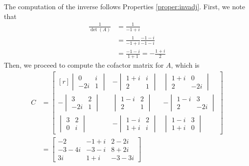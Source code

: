 \begin{solution}
The computation of the inverse follows Properties \ref{proper:invadj}. First, we note that
\begin{align*}
\frac{1}{\det(A)} &= \frac{1}{-1+i} \\
&= \frac{1}{-1+i} \frac{-1-i}{-1-i} \\
&= \frac{-1-i}{1+1} = -\frac{1+i}{2}
\end{align*}
Then, we proceed to compute the cofactor matrix for $A$, which is
\begin{align*}
C &=
\begin{bmatrix*}[r]
\begin{vmatrix}
0 & i \\
-2i & 1
\end{vmatrix} &
-\begin{vmatrix}
1+i & i \\
2 & 1
\end{vmatrix} &
\begin{vmatrix}
1+i & 0 \\
2 & -2i
\end{vmatrix} \\[10pt]
-\begin{vmatrix}
3 & 2 \\
-2i & 1
\end{vmatrix} &
\begin{vmatrix}
1-i & 2 \\
2 & 1
\end{vmatrix} &
-\begin{vmatrix}
1-i & 3 \\
2 & -2i
\end{vmatrix} \\[10pt]
\begin{vmatrix}
3 & 2 \\
0 & i
\end{vmatrix} &
-\begin{vmatrix}
1-i & 2 \\
1+i & i
\end{vmatrix} &
\begin{vmatrix}
1-i & 3 \\
1+i & 0
\end{vmatrix}
\end{bmatrix*} \\
&= 
\begin{bmatrix}
-2 & -1+i & 2-2i \\
-3-4i & -3-i & 8+2i \\
3i & 1+i & -3-3i
\end{bmatrix}

\end{align*}
\end{solution}
